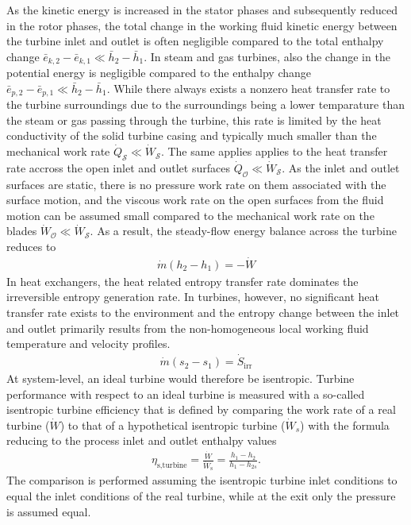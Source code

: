As the kinetic energy is increased in the stator phases and subsequently reduced in the rotor phases, the total change in the working fluid kinetic energy between the turbine inlet and outlet is often negligible compared to the total enthalpy change $\bar{e}_{k,2}-\bar{e}_{k,1}\ll \bar{h}_2-\bar{h}_1$. In steam and gas turbines, also the change in the potential energy is negligible compared to the enthalpy change $\bar{e}_{p,2}-\bar{e}_{p,1}\ll \bar{h}_2-\bar{h}_1$. While there always exists a nonzero heat transfer rate to the turbine surroundings due to the surroundings being a lower temparature than the steam or gas passing through the turbine, this rate is limited by the heat conductivity of the solid turbine casing and typically much smaller than the mechanical work rate $\dot{Q}_{\mathcal{S}}\ll\dot{W}_\mathcal{S}$. The same applies applies to the heat transfer rate accross the open inlet and outlet surfaces $\dot{Q}_\mathcal{O}\ll\dot{W}_\mathcal{S}$. As the inlet and outlet surfaces are static, there is no pressure work rate on them associated with the surface motion, and the viscous work rate on the open surfaces from the fluid motion can be assumed small compared to the mechanical work rate on the blades $\dot{W}_\mathcal{O}\ll\dot{W}_\mathcal{S}$. As a result, the steady-flow energy balance across the turbine reduces to 
\begin{align}
    \dot{m}(h_2-h_1)=-\dot{W}
\end{align}
In heat exchangers, the heat related entropy transfer rate dominates the irreversible entropy generation rate. In turbines, however, no significant heat transfer rate exists to the environment and the entropy change between the inlet and outlet primarily results from the non-homogeneous local working fluid temperature and velocity profiles. 
\begin{align}
    \dot{m}(s_2-s_1)=\dot{S}_\text{irr}
\end{align}
At system-level, an ideal turbine would therefore be isentropic. Turbine performance with respect to an ideal turbine is measured with a so-called isentropic turbine efficiency that is defined by comparing the work rate of a real turbine ($\dot{W}$) to that of a hypothetical isentropic turbine ($\dot{W}_s$) with the formula reducing to the process inlet and outlet enthalpy values
\begin{align}
    \eta_\text{s,turbine}=\frac{\dot{W}}{\dot{W}_\text{s}}=\frac{h_1-h_2}{h_1-h_{2s}}.
\end{align}
The comparison is performed assuming the isentropic turbine inlet conditions to equal the inlet conditions of the real turbine, while at the exit only the pressure is assumed equal. 

